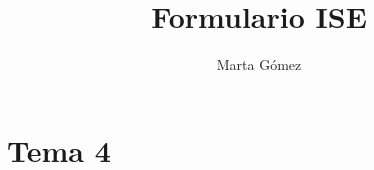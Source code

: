 \documentclass[10pt,spanish, landscape, twocolumn]{article}
\title{Formulario ISE}
\author{Marta Gómez}
\begin{document}





\section{Tema 4}
\end{document}
